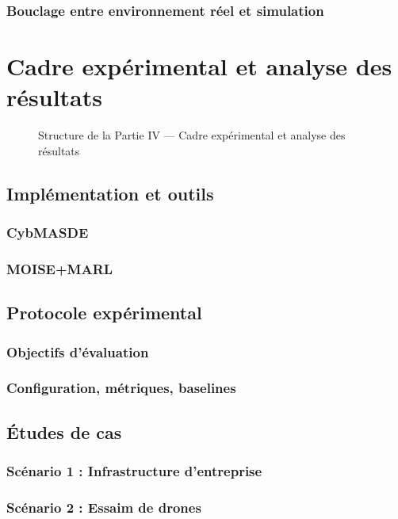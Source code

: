 \documentclass[ twoside,openright,titlepage,numbers=noenddot,headinclude,%
                footinclude=true,cleardoublepage=empty,abstractoff, %
                BCOR=5mm,paper=a4,fontsize=11pt,%
                french,american,%
                ]{scrreprt}
\begin{document}
\section{Bouclage entre environnement réel et simulation}

\part{Cadre expérimental et analyse des résultats}

\begin{figure}[h!]
    \centering
    
    \caption{Structure de la Partie IV — Cadre expérimental et analyse des résultats}
\end{figure}

\chapter{Implémentation et outils}
\section{CybMASDE}
\section{MOISE+MARL}

\chapter{Protocole expérimental}
\section{Objectifs d'évaluation}
\section{Configuration, métriques, baselines}

\chapter{Études de cas}
\section{Scénario 1 : Infrastructure d'entreprise}
\section{Scénario 2 : Essaim de drones}
\end{document}
